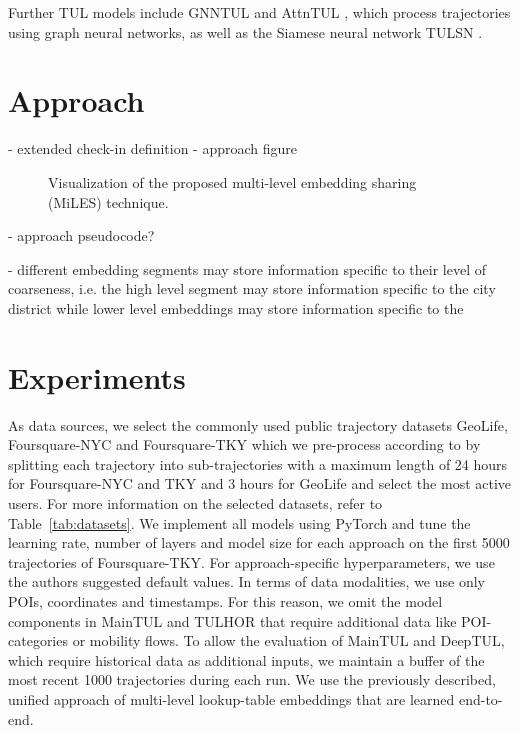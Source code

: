 \documentclass{article} %
\theoremstyle{definition}
\begin{document}
Further TUL models include GNNTUL \citep{zhouTrajectoryUserLinkingGraph2021a} and AttnTUL \citep{chenTrajectoryUserLinkingHierarchical2024}, which process trajectories using graph neural networks, as well as the Siamese neural network TULSN \citep{yuTULSNSiameseNetwork2020a}.



\section{Approach}

- extended check-in definition
- approach figure

\begin{figure}[h]
    \centering
    \resizebox{\textwidth}{!}{
        
    }
    \caption{Visualization of the proposed multi-level embedding sharing (MiLES) technique.}
\end{figure}

- approach pseudocode?

- different embedding segments may store information specific to their level of coarseness, i.e. the high level segment may store information specific to the city district while lower level embeddings may store information specific to the

\section{Experiments}

As data sources, we select the commonly used public trajectory datasets GeoLife, Foursquare-NYC and Foursquare-TKY which we pre-process according to \citet{chenMutualDistillationLearning2022a} by splitting each trajectory into sub-trajectories with a maximum length of 24 hours for Foursquare-NYC and TKY and 3 hours for GeoLife and select the most active users.
For more information on the selected datasets, refer to Table~\ref{tab:datasets}.
We implement all models using PyTorch and tune the learning rate, number of layers and model size for each approach on the first 5000 trajectories of Foursquare-TKY.
For approach-specific hyperparameters, we use the authors suggested default values.
In terms of data modalities, we use only POIs, coordinates and timestamps.
For this reason, we omit the model components in MainTUL and TULHOR that require additional data like POI-categories or mobility flows.
To allow the evaluation of MainTUL and DeepTUL, which require historical data as additional inputs, we maintain a buffer of the most recent 1000 trajectories during each run.
We use the previously described, unified approach of multi-level lookup-table embeddings that are learned end-to-end.
\end{document}
